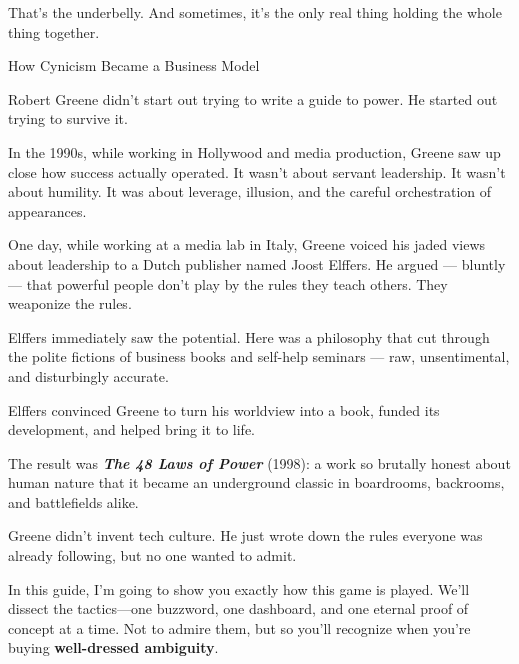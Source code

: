   That’s the underbelly.  
  And sometimes, it’s the only real thing holding the whole thing together.
 
\medskip

\begin{HistoricalSidebar}{How Cynicism Became a Business Model}

  Robert Greene didn’t start out trying to write a guide to power.  He started out trying to survive it.

  \medskip
  
  In the 1990s, while working in Hollywood and media production, Greene saw up close how success actually operated.  It wasn’t about servant leadership. It wasn’t about humility.  It was about leverage, illusion, and the careful orchestration of appearances.

  \medskip
  
  One day, while working at a media lab in Italy, Greene voiced his jaded views about leadership to a Dutch publisher named Joost Elffers.  He argued — bluntly — that powerful people don't play by the rules they teach others.  They weaponize the rules.

  \medskip
  
  Elffers immediately saw the potential.  Here was a philosophy that cut through the polite fictions of business books and self-help seminars — raw, unsentimental, and disturbingly accurate.

  \medskip
  
  Elffers convinced Greene to turn his worldview into a book, funded its development, and helped bring it to life.

  \medskip
  
  The result was \textbf{\textit{The 48 Laws of Power}} (1998): a work so brutally honest about human nature that it became an underground classic in boardrooms, backrooms, and battlefields alike.

  \medskip
  
  Greene didn’t invent tech culture.  He just wrote down the rules everyone was already following, but no one wanted to admit.
  
\end{HistoricalSidebar}

\medskip

In this guide, I’m going to show you exactly how this game is played. We’ll dissect the tactics—one buzzword, one dashboard, and one eternal proof of concept at a time. Not to admire them, but so you’ll recognize when you're buying \textbf{well-dressed ambiguity}.

